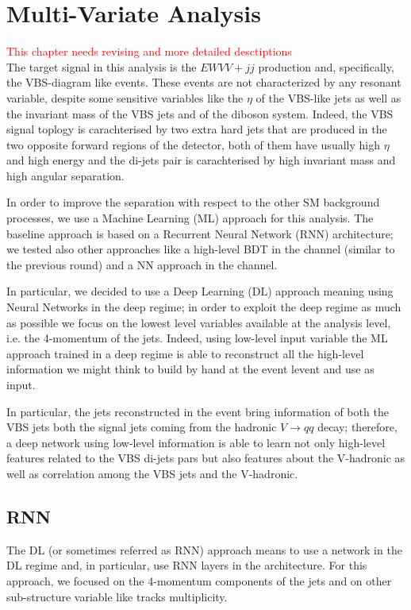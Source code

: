 \chapter{Multi-Variate Analysis}

\textcolor{red}{This chapter needs revising and more detailed desctiptions} \\
The target signal in this analysis is the $EW VV+jj$ production and, specifically, the VBS-diagram like events.
These events are not characterized by any resonant variable,
despite some sensitive variables like the $\eta$ of the VBS-like jets as well as
the invariant mass of the VBS jets and of the diboson system.
Indeed, the VBS signal toplogy is carachterised by two extra hard jets that are produced in the two opposite
forward regions of the detector, both of them have usually high $\eta$ and high energy
and the di-jets pair is carachterised by high invariant mass and high angular separation.

In order to improve the separation with respect to the other SM background processes,
we use a Machine Learning (ML) approach for this analysis.
The baseline approach is based on a Recurrent Neural Network (RNN) architecture;
we tested also other approaches like a high-level BDT in the \tlep channel (similar to the previous round)
and a NN approach in the \zlep channel.

In particular, we decided to use a Deep Learning (DL) approach meaning using Neural Networks in the deep regime;
in order to exploit the deep regime as much as possible we focus on the lowest level variables available
at the analysis level, i.e. the 4-momentum of the jets.
Indeed, using low-level input variable the ML approach trained in a deep regime is able to reconstruct all the
high-level information we might think to build by hand at the event levent and use as input.

In particular, the jets reconstructed in the event bring information of both the VBS jets both the signal jets
coming from the hadronic $V \rightarrow qq$ decay; therefore, a deep network using low-level information is able
to learn not only high-level features related to the VBS di-jets pars but also features about the V-hadronic
as well as correlation among the VBS jets and the V-hadronic.

\section{RNN}

The DL (or sometimes referred as RNN) approach means to use a network in the DL regime and, in particular, use RNN layers in the architecture. For this approach, we focused on the 4-momentum components of the jets and on other sub-structure variable like tracks multiplicity.

